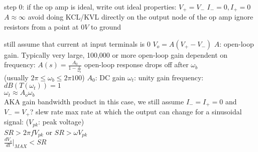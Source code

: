 \documentclass[12pt]{article}
\begin{document}
\begin{spacing}{0.8}
\begin{multicols*}{2}
\begin{flushleft}
\begin{outline}[longenum]
    \1 step 0: if the op amp is ideal, write out ideal properties:
        \2 $V_+=V_-$
        \2 $I_-=0,I_+=0$
    \2 $A \approx \infty$
    \1 avoid doing KCL/KVL directly on the output node of the op amp
    \1 ignore resistors from a point at $0V$ to ground

  \1 still assume that current at input terminals is 0
  \1 $V_o = A (V_{+} - V_{-})$
    \2 $A$: open-loop gain. Typically very large, 100,000 or more
  \1 open-loop gain dependent on frequency: $A(s)=\frac{A_0}{1-\frac{s}{\omega_b}}$
    \2 open-loop response drops off after $\omega_b$
      \\(usually $2\pi \leq \omega_b \leq 2\pi100$)
    \2 $A_0$: DC gain
    \2 $\omega_t$: unity gain frequency: $dB(T(\omega_t))=1$
      \\ $\omega_t \approx A_o \omega_b$
      \\ AKA gain bandwidth product
    \2 in this case, we still assume $I_-=I_+=0$ and $V_-=V_+$?
  \1 slew rate
    \2 max rate at which the output can change
    \2 for a sinusoidal signal: ($V_{pk}$: peak voltage)
      \\ $SR > 2 \pi f V_{pk}$ or $SR > \omega V_{pk}$
      \\ $\frac{dV_o}{dt}|_{MAX} < SR$




\end{outline}
\end{flushleft}
\end{multicols*}
\end{spacing}
\end{document}
